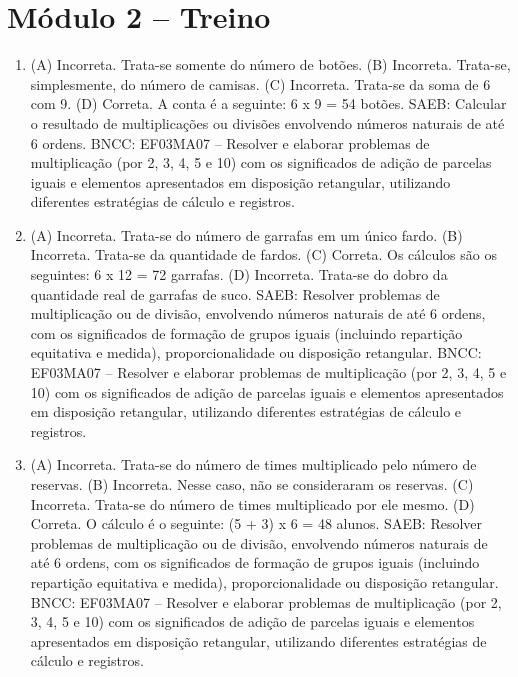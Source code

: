 \section*{Módulo 2 -- Treino}

\begin{enumerate}
\item
(A) Incorreta. Trata-se somente do número de botões.
(B) Incorreta. Trata-se, simplesmente, do número de camisas.
(C) Incorreta. Trata-se da soma de 6 com 9.
(D) Correta. A conta é a seguinte: 6 x 9 = 54 botões.
SAEB: Calcular o resultado de multiplicações ou divisões envolvendo números naturais de até 6 ordens.
BNCC: EF03MA07 – Resolver e elaborar problemas de multiplicação (por 2, 3, 4, 5 e 10) com os
significados de adição de parcelas iguais e elementos apresentados em disposição retangular,
utilizando diferentes estratégias de cálculo e registros.

\item
(A) Incorreta. Trata-se do número de garrafas em um único fardo.
(B) Incorreta. Trata-se da quantidade de fardos.
(C) Correta. Os cálculos são os seguintes: 6 x 12 = 72 garrafas.
(D) Incorreta. Trata-se do dobro da quantidade real de garrafas de suco.
SAEB: Resolver problemas de multiplicação ou de divisão, envolvendo números naturais de até 6 ordens, com os significados de formação de grupos iguais (incluindo repartição equitativa e medida), proporcionalidade ou disposição retangular.
BNCC: EF03MA07 – Resolver e elaborar problemas de multiplicação (por 2, 3, 4, 5 e 10) com os
significados de adição de parcelas iguais e elementos apresentados em disposição retangular,
utilizando diferentes estratégias de cálculo e registros.

\item
(A) Incorreta. Trata-se do número de times multiplicado pelo número de reservas.
(B) Incorreta. Nesse caso, não se consideraram os reservas.
(C) Incorreta. Trata-se do número de times multiplicado por ele mesmo.
(D) Correta. O cálculo é o seguinte: (5 + 3) x 6 = 48 alunos.
SAEB: Resolver problemas de multiplicação ou de divisão, envolvendo números naturais de até 6 ordens, com os significados de formação de grupos iguais (incluindo repartição equitativa e medida), proporcionalidade ou disposição retangular.
BNCC: EF03MA07 – Resolver e elaborar problemas de multiplicação (por 2, 3, 4, 5 e 10) com os
significados de adição de parcelas iguais e elementos apresentados em disposição retangular,
utilizando diferentes estratégias de cálculo e registros.
\end{enumerate}

